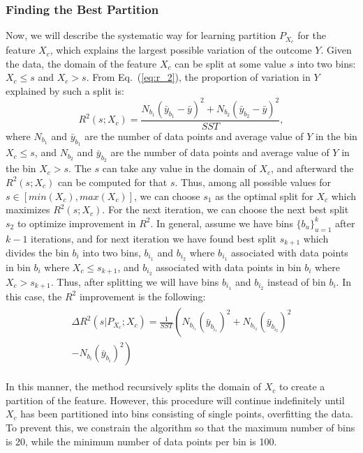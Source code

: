 \documentclass[letterpaper]{article} %
\begin{document}
\subsubsection{Finding the Best Partition}
Now, we will describe the systematic way for learning partition $P_{X_c}$ for the feature $X_c$, which explains the largest possible variation of the outcome $Y$. Given the data, the domain of the feature $X_c$ can be split at some value $s$ into two bins: $X_c \leq s$ and $X_c > s$. From Eq.~(\ref{eq:r_2}), the proportion of variation in $Y$ explained by such a split is:
\begin{equation}
R^2(s; X_c) = \frac{N_{b_1} (\bar{y}_{b_1} - \bar{y})^2 + N_{b_2} (\bar{y}_{b_2} - \bar{y})^2}{SST},
\label{eq:r_2_bins}
\end{equation}
where $N_{b_1}$ and $\bar{y}_{b_1}$ are the number of data points and average value of $Y$ in the bin $X_c \leq s$, and $N_{b_2}$ and $\bar{y}_{b_2}$ are the number of data points and average value of $Y$ in the bin $X_c > s$. The $s$ can take any value in the domain of $X_c$, and afterward the $R^2(s; X_c)$ can be computed for that $s$. Thus, among all possible values for $s \in [min(X_c), max(X_c)]$, we can choose $s_1$ as the optimal split for $X_c$ which maximizes $R^2(s; X_c)$. For the next iteration, we can choose the next best split $s_2$ to optimize improvement in $R^2$. In general, assume we have bins $\{b_u\}_{u=1}^k$ after $k - 1$ iterations, and for next iteration we have found best split $s_{k + 1}$ which divides the bin $b_i$ into two bins, $b_{i_1}$ and $b_{i_2}$ where $b_{i_1}$ associated with data points in bin $b_i$ where $X_c \leq s_{k + 1}$, and $b_{i_2}$ associated with data points in bin $b_i$ where $X_c > s_{k + 1}$. Thus, after splitting we will have bins $b_{i_1}$ and $b_{i_2}$ instead of bin $b_i$. In this case, the $R^2$ improvement is the following:
\begin{multline}
\begin{split}
\Delta R^2 (s | P_{X_c}; X_c)= \frac{1}{SST} \left( N_{b_{i_1}} (\bar{y}_{b_{i_1}})^2 + N_{b_{i_2}} (\bar{y}_{b_{i_2}})^2 \right. \\
\left. - N_{b_i} (\bar{y}_{b_i})^2 \right)
\end{split}
\end{multline}

In this manner, the method recursively splits the domain of $X_c$ to create a partition of the feature.
However, this procedure will continue indefinitely until $X_c$ has been partitioned into bins consisting of single points, overfitting the data.
To prevent this, we constrain the algorithm so that the maximum number of bins is 20, while the minimum number of data points per bin is 100.
\end{document}

